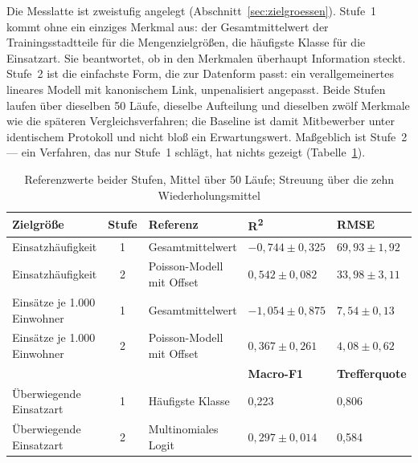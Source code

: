Die Messlatte ist zweistufig angelegt (Abschnitt~\ref{sec:zielgroessen}).
Stufe~1 kommt ohne ein einziges Merkmal aus: der Gesamtmittelwert der
Trainingsstadtteile für die Mengenzielgrößen, die häufigste Klasse für die
Einsatzart. Sie beantwortet, ob in den Merkmalen überhaupt Information steckt.
Stufe~2 ist die einfachste Form, die zur Datenform passt: ein verallgemeinertes
lineares Modell mit kanonischem Link, unpenalisiert angepasst. Beide Stufen
laufen über dieselben 50 Läufe, dieselbe Aufteilung und dieselben zwölf
Merkmale wie die späteren Vergleichsverfahren; die Baseline ist damit
Mitbewerber unter identischem Protokoll und nicht bloß ein Erwartungswert.
Maßgeblich ist Stufe~2 --- ein Verfahren, das nur Stufe~1 schlägt, hat nichts
gezeigt (Tabelle~\ref{tab:baselines}).

\begin{table}[htbp]
    \centering
    \caption{Referenzwerte beider Stufen, Mittel über 50 Läufe; Streuung über die zehn Wiederholungsmittel}
    \label{tab:baselines}
    \footnotesize
    \singlespacing
    \setlength{\tabcolsep}{5pt}
    \begin{tabularx}{\textwidth}{@{}>{\raggedright\arraybackslash}p{3.9cm} c >{\raggedright\arraybackslash}X l l@{}}
        \toprule
        \textbf{Zielgröße} & \textbf{Stufe} & \textbf{Referenz} & \textbf{R\textsuperscript{2}} & \textbf{RMSE} \\
        \midrule
        Einsatzhäufigkeit & 1 & Gesamtmittelwert & $-0{,}744 \pm 0{,}325$ & $69{,}93 \pm 1{,}92$ \\
        Einsatzhäufigkeit & 2 & Poisson-Modell mit Offset & $0{,}542 \pm 0{,}082$ & $33{,}98 \pm 3{,}11$ \\
        Einsätze je 1.000 Einwohner & 1 & Gesamtmittelwert & $-1{,}054 \pm 0{,}875$ & $7{,}54 \pm 0{,}13$ \\
        Einsätze je 1.000 Einwohner & 2 & Poisson-Modell mit Offset & $0{,}367 \pm 0{,}261$ & $4{,}08 \pm 0{,}62$ \\
        \midrule
        & & & \textbf{Macro-F1} & \textbf{Trefferquote} \\
        \cmidrule(l){4-5}
        Überwiegende Einsatzart & 1 & Häufigste Klasse & 0,223 & 0,806 \\
        Überwiegende Einsatzart & 2 & Multinomiales Logit & $0{,}297 \pm 0{,}014$ & 0,584 \\
        \bottomrule
    \end{tabularx}
\end{table}

